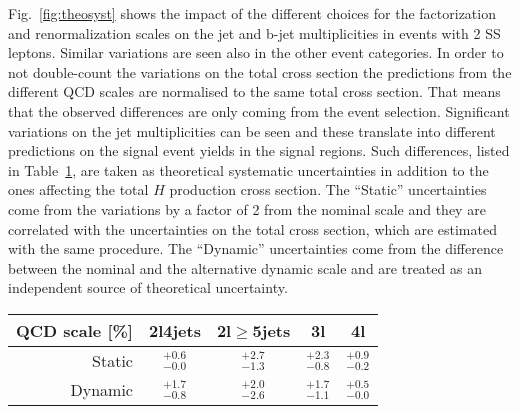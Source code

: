 Fig.~\ref{fig:theosyst} shows the impact of the different choices for the factorization and renormalization scales on the jet and b-jet multiplicities in events with 2 SS leptons. Similar variations are seen also in the other event categories. In order to not double-count the variations on the total cross section the predictions from the different QCD scales are normalised to the same total cross section. That means that the observed differences are only coming from the event selection.
Significant variations on the jet multiplicities can be seen and these translate into different predictions on the signal event yields in the signal regions. Such differences, listed in Table~\ref{tab:theosystttH}, are taken as theoretical systematic uncertainties in addition to the ones affecting the total \ttbar$H$ production cross section. The ``Static'' uncertainties come from the variations by a factor of 2 from the nominal scale and they are correlated with the uncertainties on the total cross section, which are estimated with the same procedure. The ``Dynamic''  uncertainties come from the difference between the nominal and the alternative dynamic scale and are treated as an independent source of theoretical uncertainty. 

\begin{table}
\begin{center} 
\begin{tabular}{r|c|c|c|c|}
QCD scale [\%] & 2l4jets & 2l$\geq$5jets & 3l & 4l \\
\hline
Static   & $^{+0.6}_{-0.0}$ & $^{+2.7}_{-1.3}$ & $^{+2.3}_{-0.8}$ & $^{+0.9}_{-0.2}$ \\
Dynamic  & $^{+1.7}_{-0.8}$ & $^{+2.0}_{-2.6}$ & $^{+1.7}_{-1.1}$ & $^{+0.5}_{-0.0}$ \\
\hline
\end{tabular}
\end{center}
\label{tab:theosystttH}
\end{table}%

